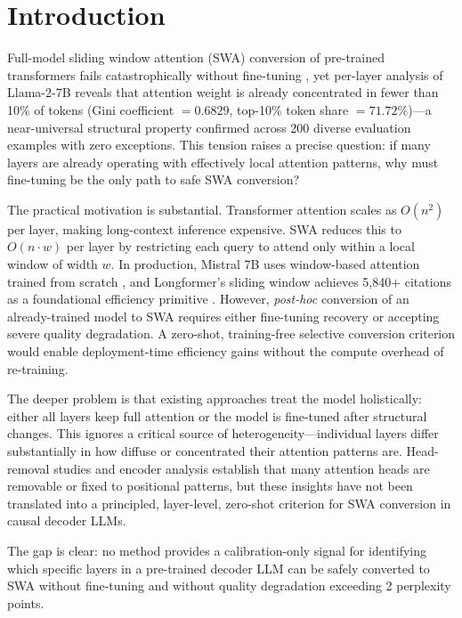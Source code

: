 \section{Introduction}

Full-model sliding window attention (SWA) conversion of pre-trained transformers fails catastrophically without fine-tuning \cite{Yu2025SWAA}, yet per-layer analysis of Llama-2-7B reveals that attention weight is already concentrated in fewer than 10\% of tokens (Gini coefficient $= 0.6829$, top-10\% token share $= 71.72\%$)---a near-universal structural property confirmed across 200 diverse evaluation examples with zero exceptions. This tension raises a precise question: if many layers are already operating with effectively local attention patterns, why must fine-tuning be the only path to safe SWA conversion?

The practical motivation is substantial. Transformer attention scales as $O(n^2)$ per layer, making long-context inference expensive. SWA reduces this to $O(n \cdot w)$ per layer by restricting each query to attend only within a local window of width $w$. In production, Mistral 7B uses window-based attention trained from scratch \cite{Jiang2023Mistral}, and Longformer's sliding window achieves 5,840+ citations as a foundational efficiency primitive \cite{Beltagy2020Longformer}. However, \emph{post-hoc} conversion of an already-trained model to SWA requires either fine-tuning recovery \cite{Yu2025SWAA,Liu2026Architecture} or accepting severe quality degradation. A zero-shot, training-free selective conversion criterion would enable deployment-time efficiency gains without the compute overhead of re-training.

The deeper problem is that existing approaches treat the model holistically: either all layers keep full attention or the model is fine-tuned after structural changes. This ignores a critical source of heterogeneity---individual layers differ substantially in how diffuse or concentrated their attention patterns are. Head-removal studies \cite{Michel2019Sixteen} and encoder analysis \cite{Raganato2020Fixed} establish that many attention heads are removable or fixed to positional patterns, but these insights have not been translated into a principled, layer-level, zero-shot criterion for SWA conversion in causal decoder LLMs.

The gap is clear: no method provides a calibration-only signal for identifying which specific layers in a pre-trained decoder LLM can be safely converted to SWA without fine-tuning and without quality degradation exceeding 2 perplexity points.

